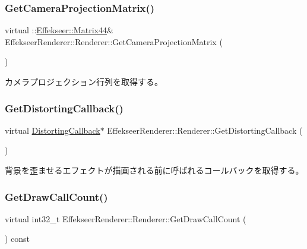 \subsubsection{\texorpdfstring{Get\+Camera\+Projection\+Matrix()}{GetCameraProjectionMatrix()}}
{\footnotesize\ttfamily virtual \+::\mbox{\hyperlink{struct_effekseer_1_1_matrix44}{Effekseer\+::\+Matrix44}}\& Effekseer\+Renderer\+::\+Renderer\+::\+Get\+Camera\+Projection\+Matrix (\begin{DoxyParamCaption}{ }\end{DoxyParamCaption})\hspace{0.3cm}{\ttfamily [pure virtual]}}



カメラプロジェクション行列を取得する。 

\mbox{\label{class_effekseer_renderer_1_1_renderer_af4db92a0262062bfcc8f3f2334e5a168}} 
\subsubsection{\texorpdfstring{Get\+Distorting\+Callback()}{GetDistortingCallback()}}
{\footnotesize\ttfamily virtual \mbox{\hyperlink{class_effekseer_renderer_1_1_distorting_callback}{Distorting\+Callback}}$\ast$ Effekseer\+Renderer\+::\+Renderer\+::\+Get\+Distorting\+Callback (\begin{DoxyParamCaption}{ }\end{DoxyParamCaption})\hspace{0.3cm}{\ttfamily [pure virtual]}}



背景を歪ませるエフェクトが描画される前に呼ばれるコールバックを取得する。 

\mbox{\label{class_effekseer_renderer_1_1_renderer_a1169dda7afa6933c049bd5f914c2fecb}} 
\subsubsection{\texorpdfstring{Get\+Draw\+Call\+Count()}{GetDrawCallCount()}}
{\footnotesize\ttfamily virtual int32\+\_\+t Effekseer\+Renderer\+::\+Renderer\+::\+Get\+Draw\+Call\+Count (\begin{DoxyParamCaption}{ }\end{DoxyParamCaption}) const\hspace{0.3cm}{\ttfamily [pure virtual]}}



